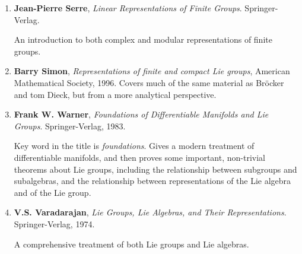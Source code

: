 \documentclass[12pt]{amsbook}
\theoremstyle{plain}
\numberwithin{equation}{chapter}
\numberwithin{theorem}{chapter}
\begin{document}
\begin{enumerate}
\item \textbf{Jean-Pierre Serre}, \textit{Linear Representations of Finite
Groups}. Springer-Verlag.

An introduction to both complex and modular representations of finite groups.

\item \textbf{Barry Simon}, \textit{Representations of finite and compact Lie
groups}, American Mathematical Society, 1996. Covers much of the same material
as Br\"{o}cker and tom Dieck, but from a more analytical perspective.

\item \textbf{Frank W. Warner}, \textit{Foundations of Differentiable
Manifolds and Lie Groups}. Springer-Verlag, 1983.

Key word in the title is \textit{foundations}. Gives a modern treatment of
differentiable manifolds, and then proves some important, non-trivial theorems
about Lie groups, including the relationship between subgroups and
subalgebras, and the relationship between representations of the Lie algebra
and of the Lie group.

\item \textbf{V.S. Varadarajan}, \textit{Lie Groups, Lie Algebras, and Their
Representations}. Springer-Verlag, 1974.

A comprehensive treatment of both Lie groups and Lie algebras.
\end{enumerate}
\end{document}
